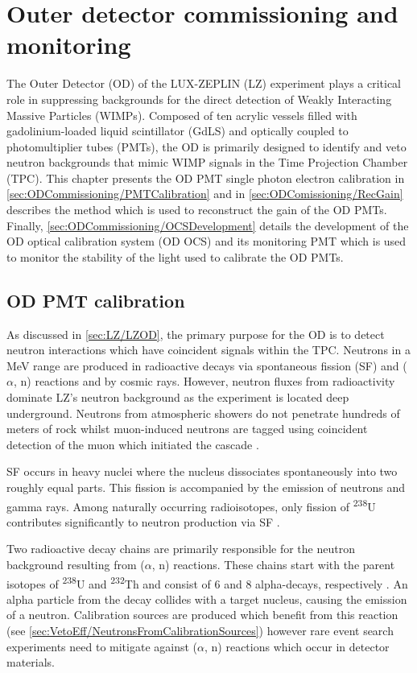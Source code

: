 \chapter{Outer detector commissioning and monitoring}\label{chap:ODCommissioning}
The Outer Detector (OD) of the LUX-ZEPLIN (LZ) experiment plays a critical role in suppressing backgrounds for the direct detection of Weakly Interacting Massive Particles (WIMPs). Composed of ten acrylic vessels filled with gadolinium-loaded liquid scintillator (GdLS) and optically coupled to photomultiplier tubes (PMTs), the OD is primarily designed to identify and veto neutron backgrounds that mimic WIMP signals in the Time Projection Chamber (TPC). This chapter presents the OD PMT single photon electron calibration in \autoref{sec:ODCommissioning/PMTCalibration} and in \autoref{sec:ODComissioning/RecGain} describes the method which is used to reconstruct the gain of the OD PMTs. Finally, \autoref{sec:ODCommissioning/OCSDevelopment} details the development of the OD optical calibration system (OD OCS) and its monitoring PMT which is used to monitor the stability of the light used to calibrate the OD PMTs.

\section{OD PMT calibration}\label{sec:ODCommissioning/PMTCalibration}
As discussed in \autoref{sec:LZ/LZOD}, the primary purpose for the OD is to detect neutron interactions which have coincident signals within the TPC. Neutrons in a MeV range are produced in radioactive decays via spontaneous fission (SF) and ($\alpha$, n) reactions and by cosmic rays. However, neutron fluxes from radioactivity dominate LZ's neutron background as the experiment is located deep underground. Neutrons from atmospheric showers do not penetrate hundreds of meters of rock whilst muon-induced neutrons are tagged using coincident detection of the muon which initiated the cascade \cite{LZ_SIMS}.

SF occurs in heavy nuclei where the nucleus dissociates spontaneously into two roughly equal parts. This fission is accompanied by the emission of neutrons and gamma rays. Among naturally occurring radioisotopes, only fission of \textsuperscript{238}U contributes significantly to neutron production via SF \cite{Kudryavtsev:2020eer}.

Two radioactive decay chains are primarily responsible for the neutron background resulting from ($\alpha$, n) reactions. These chains start with the parent isotopes of \textsuperscript{238}U and \textsuperscript{232}Th and consist of 6 and 8 alpha-decays, respectively \cite{Kudryavtsev:2020eer}. An alpha particle from the decay collides with a target nucleus, causing the emission of a neutron. Calibration sources are produced which benefit from this reaction (see \autoref{sec:VetoEff/NeutronsFromCalibrationSources}) however rare event search experiments need to mitigate against ($\alpha$, n) reactions which occur in detector materials.

